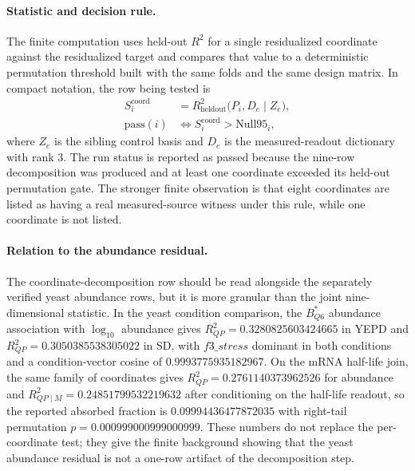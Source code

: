 \paragraph{Statistic and decision rule.}  The finite computation uses held-out $R^2$ for a single residualized coordinate against the residualized target and compares that value to a deterministic permutation threshold built with the same folds and the same design matrix.  In compact notation, the row being tested is
$$
\begin{aligned}
S_i^{\mathrm{coord}} &= R^2_{\mathrm{heldout}}\bigl(P_i, D_e \mid Z_e\bigr),\\
\mathrm{pass}(i) &\Longleftrightarrow S_i^{\mathrm{coord}} > \mathrm{Null95}_i,
\end{aligned}
$$
where $Z_e$ is the sibling control basis and $D_e$ is the measured-readout dictionary with rank $3$.  The run status is reported as passed because the nine-row decomposition was produced and at least one coordinate exceeded its held-out permutation gate.  The stronger finite observation is that eight coordinates are listed as having a real measured-source witness under this rule, while one coordinate is not listed.

\paragraph{Relation to the abundance residual.}  The coordinate-decomposition row should be read alongside the separately verified yeast abundance rows, but it is more granular than the joint nine-dimensional statistic.  In the yeast condition comparison, the $B^\ast_{Q6}$ abundance association with $\log_{10}$ abundance gives $R^2_{QP}=0.3280825603424665$ in YEPD and $R^2_{QP}=0.3050385538305022$ in SD, with $f3\_stress$ dominant in both conditions and a condition-vector cosine of $0.9993775935182967$.  On the mRNA half-life join, the same family of coordinates gives $R^2_{QP}=0.2761140373962526$ for abundance and $R^2_{QP\mid M}=0.24851799532219632$ after conditioning on the half-life readout, so the reported absorbed fraction is $0.09994436477872035$ with right-tail permutation $p=0.000999000999000999$.  These numbers do not replace the per-coordinate test; they give the finite background showing that the yeast abundance residual is not a one-row artifact of the decomposition step.

